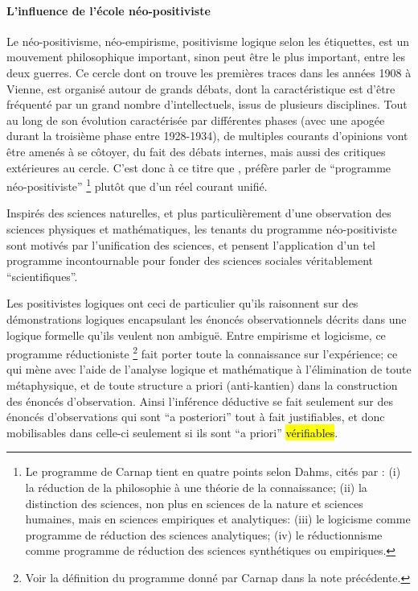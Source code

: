 
\paragraph{L'influence de l'école néo-positiviste}

Le néo-positivisme, néo-empirisme, positivisme logique selon les étiquettes, est un mouvement philosophique important, sinon peut être le plus important, entre les deux guerres. Ce cercle dont on trouve les premières traces dans les années 1908 à Vienne, est organisé autour de grands débats, dont la caractéristique est d'être fréquenté par un grand nombre d'intellectuels, issus de plusieurs disciplines. Tout au long de son évolution caractérisée par différentes phases (avec une apogée durant la troisième phase entre 1928-1934), de multiples courants d'opinions \textcite[126]{Ouelbani2006} vont être amenés à se côtoyer, du fait des débats internes, mais aussi des critiques extérieures au cercle. C'est donc à ce titre que \textcite[11]{Ouelbani2006}, préfère parler de \enquote{programme néo-positiviste} \footnote{Le programme de Carnap tient en quatre points selon Dahms, cités par \textcite{Ouelbani2006} : (i) la réduction de la philosophie à une théorie de la connaissance; (ii) la distinction des sciences, non plus en sciences de la nature et sciences humaines, mais en sciences empiriques et analytiques: (iii) le logicisme comme programme de réduction des sciences analytiques; (iv) le réductionnisme comme programme de réduction des sciences synthétiques ou empiriques.} plutôt que d'un réel courant unifié.

Inspirés des sciences naturelles, et plus particulièrement d'une observation des sciences physiques et mathématiques, les tenants du programme néo-positiviste sont motivés par l'unification des sciences, et pensent l'application d'un tel programme incontournable pour fonder des sciences sociales véritablement \enquote{scientifiques}. \textcite[1-20]{Ouelbani2006}

Les positivistes logiques ont ceci de particulier qu'ils raisonnent sur des démonstrations logiques encapsulant les énoncés observationnels décrits dans une logique formelle qu'ils veulent non ambiguë. Entre empirisme et logicisme, ce programme réductioniste \footnote{Voir la définition du programme donné par Carnap dans la note précédente.} fait porter toute la connaissance sur l'expérience; ce qui mène avec l'aide de l'analyse logique et mathématique à l'élimination de toute métaphysique, et de toute structure a priori (anti-kantien) dans la construction des énoncés d'observation. Ainsi l'inférence déductive se fait seulement sur des énoncés d'observations qui sont \foreignquote{latin}{a posteriori} tout à fait justifiables, et donc mobilisables dans celle-ci seulement si ils sont \foreignquote{latin}{a priori} \hl{vérifiables}.

